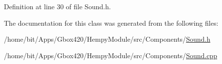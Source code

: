 Definition at line 30 of file Sound.\+h.



The documentation for this class was generated from the following files\+:\begin{DoxyCompactItemize}
\item 
/home/bit/\+Apps/\+Gbox420/\+Hempy\+Module/src/\+Components/\hyperlink{_hempy_module_2src_2_components_2_sound_8h}{Sound.\+h}\item 
/home/bit/\+Apps/\+Gbox420/\+Hempy\+Module/src/\+Components/\hyperlink{_hempy_module_2src_2_components_2_sound_8cpp}{Sound.\+cpp}\end{DoxyCompactItemize}
